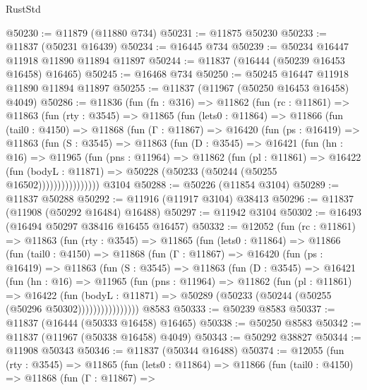 \begin{lexlean}{RustStd}
\begin{coremodule}
{\begin{coremodule}
{{{{{{{{{{{{{{{{{{{{{{{{{{{{{{{{{{{{{{{{{{{{{{{{{{@50230 := @11879 (@11880 @734)
@50231 := @11875 @50230
@50233 := @11837 (@50231 @16439)
@50234 := @16445 @734
@50239 := @50234 @16447 @11918 @11890 @11894 @11897
@50244 := @11837 (@16444 (@50239 @16453 @16458) @16465)
@50245 := @16468 @734
@50250 := @50245 @16447 @11918 @11890 @11894 @11897
@50255 := @11837 (@11967 (@50250 @16453 @16458) @4049)
@50286 := @11836
    (fun (fn : @316) =>
    @11862
      (fun (rc : @11861) =>
      @11863
        (fun (rty : @3545) =>
        @11865
          (fun (lets0 : @11864) =>
          @11866
            (fun (tail0 : @4150) =>
            @11868
              (fun (Γ : @11867) =>
              @16420
                (fun (ps : @16419) =>
                @11863
                  (fun (S : @3545) =>
                  @11863
                    (fun (D : @3545) =>
                    @16421
                      (fun (hn : @16) =>
                      @11965
                        (fun (pns : @11964) =>
                        @11862
                          (fun (pl : @11861) =>
                          @16422
                            (fun (bodyL : @11871) =>
                            @50228 (@50233 (@50244 (@50255 @16502))))))))))))))))
    @3104
@50288 := @50226 (@11854 @3104)
@50289 := @11837 @50288
@50292 := @11916 (@11917 @3104) @38413
@50296 := @11837 (@11908 (@50292 @16484) @16488)
@50297 := @11942 @3104
@50302 := @16493 (@16494 @50297 @38416 @16455 @16457)
@50332 := @12052
    (fun (rc : @11861) =>
    @11863
      (fun (rty : @3545) =>
      @11865
        (fun (lets0 : @11864) =>
        @11866
          (fun (tail0 : @4150) =>
          @11868
            (fun (Γ : @11867) =>
            @16420
              (fun (ps : @16419) =>
              @11863
                (fun (S : @3545) =>
                @11863
                  (fun (D : @3545) =>
                  @16421
                    (fun (hn : @16) =>
                    @11965
                      (fun (pns : @11964) =>
                      @11862
                        (fun (pl : @11861) =>
                        @16422
                          (fun (bodyL : @11871) =>
                          @50289 (@50233 (@50244 (@50255 (@50296 @50302))))))))))))))))
    @8583
@50333 := @50239 @8583
@50337 := @11837 (@16444 (@50333 @16458) @16465)
@50338 := @50250 @8583
@50342 := @11837 (@11967 (@50338 @16458) @4049)
@50343 := @50292 @38827
@50344 := @11908 @50343
@50346 := @11837 (@50344 @16488)
@50374 := @12055
    (fun (rty : @3545) =>
    @11865
      (fun (lets0 : @11864) =>
      @11866
        (fun (tail0 : @4150) =>
        @11868
          (fun (Γ : @11867) =>
}}}}}}}}}}}}}}}}}}}}}}}}}}}}}}}}}}}}}}}}}}}}}}}}}}
\end{coremodule}}
\end{coremodule}
\end{lexlean}

